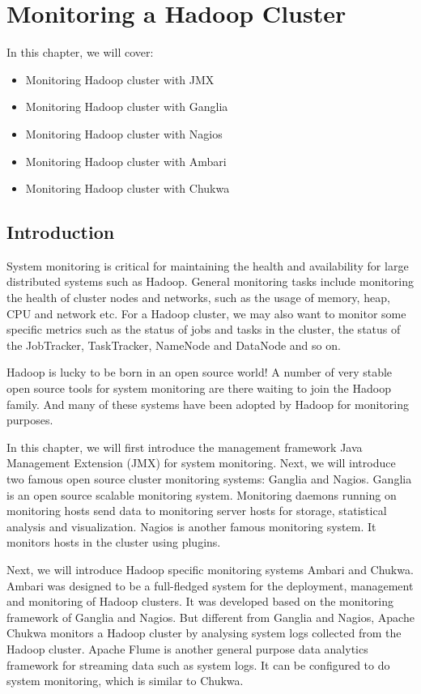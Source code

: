 \chapter{Monitoring a Hadoop Cluster}\label{chap:6}
In this chapter, we will cover:
\begin{itemize}
  \item Monitoring Hadoop cluster with JMX
  \item Monitoring Hadoop cluster with Ganglia
  \item Monitoring Hadoop cluster with Nagios
  \item Monitoring Hadoop cluster with Ambari
  \item Monitoring Hadoop cluster with Chukwa
\end{itemize}

\section{Introduction}
System monitoring is critical for maintaining the health and availability for large distributed systems such as Hadoop. General monitoring tasks include monitoring the health of cluster nodes and networks, such as the usage of memory, heap, CPU and network etc. For a Hadoop cluster, we may also want to monitor some specific metrics such as the status of jobs and tasks in the cluster, the status of the JobTracker, TaskTracker, NameNode and DataNode and so on.

Hadoop is lucky to be born in an open source world! A number of very stable open source tools for system monitoring are there waiting to join the Hadoop family. And many of these systems have been adopted by Hadoop for monitoring purposes.

In this chapter, we will first introduce the management framework Java Management Extension (JMX) for system monitoring. Next, we will introduce two famous open source cluster monitoring systems: Ganglia and Nagios. Ganglia is an open source scalable monitoring system. Monitoring daemons running on monitoring hosts send data to monitoring server hosts for storage, statistical analysis and visualization. Nagios is another famous monitoring system. It monitors hosts in the cluster using plugins.

Next, we will introduce Hadoop specific monitoring systems Ambari and Chukwa. Ambari was designed to be a full-fledged system for the deployment, management and monitoring of Hadoop clusters. It was developed based on the monitoring framework of Ganglia and Nagios. But different from Ganglia and Nagios, Apache Chukwa monitors a Hadoop cluster by analysing system logs collected from the Hadoop cluster. Apache Flume is another general purpose data analytics framework for streaming data such as system logs. It can be configured to do system monitoring, which is similar to Chukwa.

